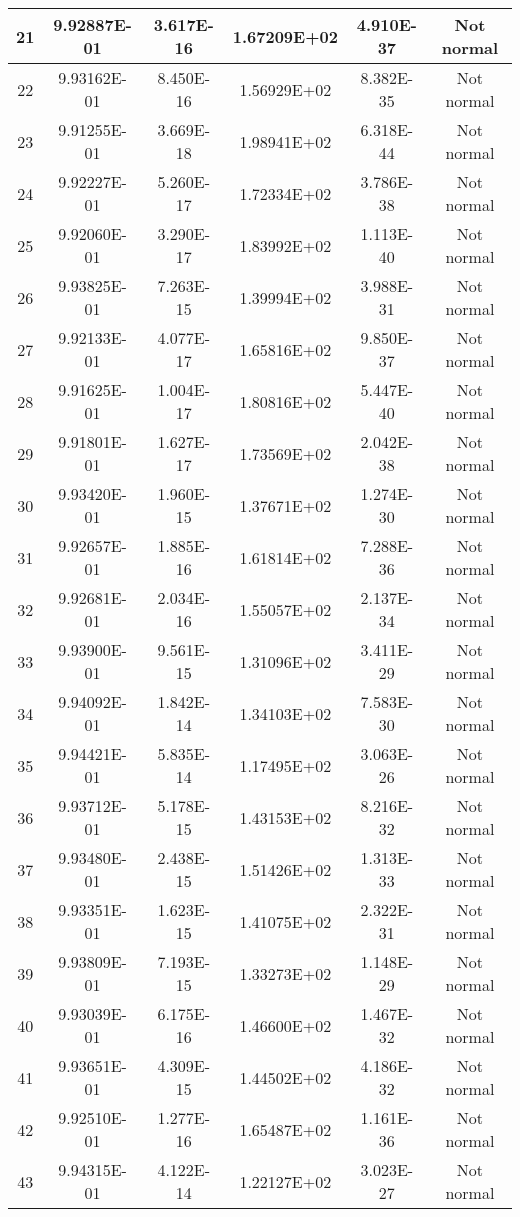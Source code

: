 \begin{table}[h]
\begin{tabular}{|c|c|c|c|c|c|}
		21 & 9.92887E-01 & 3.617E-16 & 1.67209E+02 & 4.910E-37 & Not normal\\\hline
		22 & 9.93162E-01 & 8.450E-16 & 1.56929E+02 & 8.382E-35 & Not normal\\\hline
		23 & 9.91255E-01 & 3.669E-18 & 1.98941E+02 & 6.318E-44 & Not normal\\\hline
		24 & 9.92227E-01 & 5.260E-17 & 1.72334E+02 & 3.786E-38 & Not normal\\\hline
		25 & 9.92060E-01 & 3.290E-17 & 1.83992E+02 & 1.113E-40 & Not normal\\\hline
		26 & 9.93825E-01 & 7.263E-15 & 1.39994E+02 & 3.988E-31 & Not normal\\\hline
		27 & 9.92133E-01 & 4.077E-17 & 1.65816E+02 & 9.850E-37 & Not normal\\\hline
		28 & 9.91625E-01 & 1.004E-17 & 1.80816E+02 & 5.447E-40 & Not normal\\\hline
		29 & 9.91801E-01 & 1.627E-17 & 1.73569E+02 & 2.042E-38 & Not normal\\\hline
		30 & 9.93420E-01 & 1.960E-15 & 1.37671E+02 & 1.274E-30 & Not normal\\\hline
		31 & 9.92657E-01 & 1.885E-16 & 1.61814E+02 & 7.288E-36 & Not normal\\\hline
		32 & 9.92681E-01 & 2.034E-16 & 1.55057E+02 & 2.137E-34 & Not normal\\\hline
		33 & 9.93900E-01 & 9.561E-15 & 1.31096E+02 & 3.411E-29 & Not normal\\\hline
		34 & 9.94092E-01 & 1.842E-14 & 1.34103E+02 & 7.583E-30 & Not normal\\\hline
		35 & 9.94421E-01 & 5.835E-14 & 1.17495E+02 & 3.063E-26 & Not normal\\\hline
		36 & 9.93712E-01 & 5.178E-15 & 1.43153E+02 & 8.216E-32 & Not normal\\\hline
		37 & 9.93480E-01 & 2.438E-15 & 1.51426E+02 & 1.313E-33 & Not normal\\\hline
		38 & 9.93351E-01 & 1.623E-15 & 1.41075E+02 & 2.322E-31 & Not normal\\\hline
		39 & 9.93809E-01 & 7.193E-15 & 1.33273E+02 & 1.148E-29 & Not normal\\\hline
		40 & 9.93039E-01 & 6.175E-16 & 1.46600E+02 & 1.467E-32 & Not normal\\\hline
		41 & 9.93651E-01 & 4.309E-15 & 1.44502E+02 & 4.186E-32 & Not normal\\\hline
		42 & 9.92510E-01 & 1.277E-16 & 1.65487E+02 & 1.161E-36 & Not normal\\\hline
		43 & 9.94315E-01 & 4.122E-14 & 1.22127E+02 & 3.023E-27 & Not normal\\\hline

\end{tabular}
\end{table}
